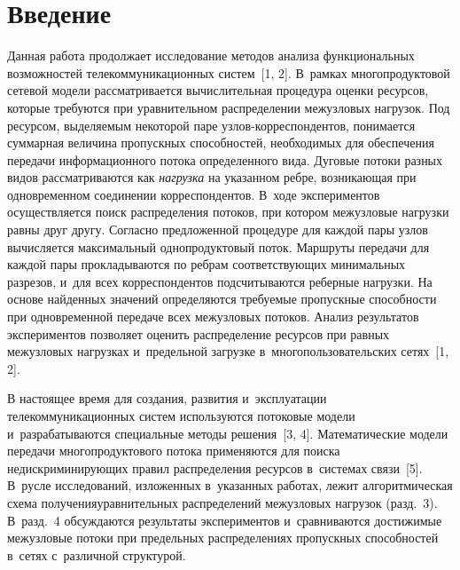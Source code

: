 
\thispagestyle{headings}

\begin{multicols}{2}

\label{st\stat}


\section{Введение}

Данная работа продолжает исследование методов анализа  функциональных возможностей  телекоммуникационных сис\-тем~[1, 2].  
В~рамках многопродуктовой сетевой модели рассматривается \mbox{вычислительная} процедура оценки ресурсов, которые требуются при уравнительном 
распределении межузловых  нагрузок. Под ресурсом,  выделяемым  некоторой паре уз\-лов-кор\-рес\-пон\-ден\-тов, 
понимается суммарная величина пропускных способностей, необходимых для обеспечения  передачи информационного потока определенного вида.
 Дуговые потоки разных видов рассматриваются как   \textit{нагрузка} на указанном ребре,  возникающая при одновременном соединении корреспондентов.  
 В~ходе экспериментов осуществляется поиск распределения потоков, при котором  межузловые  нагрузки  равны друг другу. 
 Согласно предложенной  процедуре для каждой пары узлов вычисляется максимальный однопродуктовый поток. Маршруты передачи для каждой 
 пары прокладываются по ребрам соответствующих минимальных разрезов, и~для  всех корреспондентов  подсчитываются  реберные  нагрузки.  
 На основе найденных значений определяются требуемые пропускные способности при одновременной передаче  всех межузловых потоков. 
 Анализ результатов экспериментов  позволяет  оценить  распределение ресурсов при равных межузловых нагрузках и~предельной загрузке в~многопользовательских 
  сетях~[1, 2].

В настоящее время для создания, развития и~эксплуатации  телекоммуникационных систем используются потоковые модели и~разрабатываются специальные методы решения~[3, 4]. 
Математические  модели передачи многопродуктового потока применяются для поиска недискриминирующих правил распределения ресурсов в~системах связи~[5].   
В~русле исследований, изложенных в~указанных работах, лежит   алгоритмическая схема получения\linebreak уравнительных распределений  межузловых нагрузок (разд.~3). 
В~разд.~4 обсуждаются результаты  экспериментов  и~сравниваются  достижимые  межузловые  потоки   при  предельных  распределениях 
\mbox{пропускных} способностей   в~сетях с~различной структурой.  


\end{multicols}
